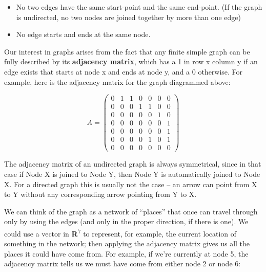\documentclass[oneside,english]{amsbook}
\numberwithin{section}{chapter}
\theoremstyle{plain}
\theoremstyle{definition}
\begin{document}
\begin{itemize}
	\item
	No two edges have the same start-point and the same end-point. (If the
	graph is undirected, no two nodes are joined together by more than one
	edge)
	\item
	No edge starts and ends at the same node.
\end{itemize}

Our interest in graphs arises from the fact that any finite simple graph
can be fully described by its \textbf{adjacency matrix}, which has a 1
in row x column y if an edge exists that starts at node x and ends at
node y, and a 0 otherwise. For example, here is the adjacency matrix for
the graph diagrammed above:

\[A = \begin{pmatrix}
	0 & 1 & 1 & 0 & 0 & 0 & 0 \\
	0 & 0 & 0 & 1 & 1 & 0 & 0 \\
	0 & 0 & 0 & 0 & 0 & 1 & 0 \\
	0 & 0 & 0 & 0 & 0 & 0 & 1 \\
	0 & 0 & 0 & 0 & 0 & 0 & 1 \\
	0 & 0 & 0 & 0 & 1 & 0 & 1 \\
	0 & 0 & 0 & 0 & 0 & 0 & 0
\end{pmatrix}\]

The adjacency matrix of an undirected graph is always symmetrical, since
in that case if Node X is joined to Node Y, then Node Y is automatically
joined to Node X. For a directed graph this is usually not the case --
an arrow can point from X to Y without any corresponding arrow pointing
from Y to X.

We can think of the graph as a network of ``places'' that once can
travel through only by using the edges (and only in the proper
direction, if there is one). We could use a vector in
\textbf{R}\textsuperscript{7} to represent, for example, the current
location of something in the network; then applying the adjacency matrix
gives us all the places it could have come from. For example, if we're
currently at node 5, the adjacency matrix tells us we must have come
from either node 2 or node 6:
\end{document}
